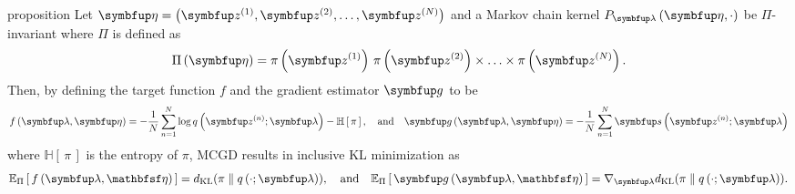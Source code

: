 
\begin{theoremEnd}{proposition}\label{thm:product_kernel}
  Let \(\veta = \left( \vz^{(1)}, \vz^{(2)}, \ldots, \vz^{(N)} \right)\) and a Markov chain kernel \(P_{\vlambda}\left(\veta, \cdot\right)\) be \(\Pi\)-invariant where \(\Pi\) is defined as
  {%
  \[
  \Pi\left(\veta\right) = \pi\left(\vz^{(1)}\right) \, \pi\left(\vz^{(2)}\right) \times \ldots \times \pi\left(\vz^{(N)}\right).
  \]
  }
  Then, by defining the target function \(f\) and the gradient estimator \(\vg\) to be 
  {%
  \begin{align*}
    f\left(\vlambda, \veta\right) =  -\frac{1}{N} \sum^{N}_{n=1} \log q\left(\vz^{(n)}; \vlambda\right) - \mathbb{H}\left[\,\pi\,\right], 
    \quad\text{and}\quad
    \vg\left(\vlambda, \veta\right) =  -\frac{1}{N} \sum^{N}_{n=1} \vs\left(\vz^{(n)}; \vlambda\right)
  \end{align*}
  }
  where \(\mathbb{H}\left[\,\pi\,\right]\) is the entropy of \(\pi\), MCGD results in inclusive KL minimization as
  {%
  \begin{align*}
    \Esub{\Pi}{ f\left(\vlambda, \rvveta\right) } = \DKL{\pi}{q\left(\cdot; \vlambda\right)},
    \quad\text{and}\quad
    \Esub{\Pi}{ \vg\left(\vlambda, \rvveta\right) } = \nabla_{\vlambda} \DKL{\pi}{q\left(\cdot; \vlambda\right)}.
  \end{align*}
  }
\end{theoremEnd}
